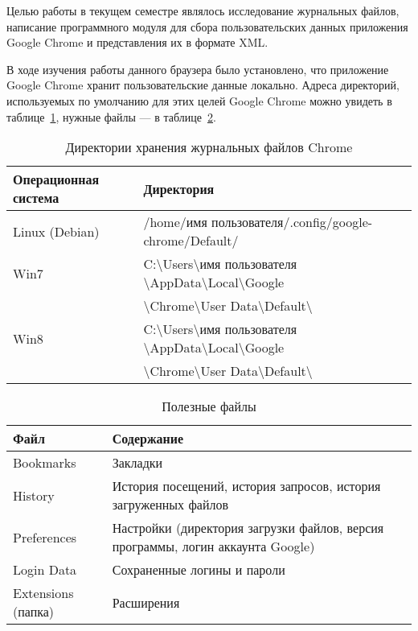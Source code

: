 Целью работы в текущем семестре являлось исследование журнальных файлов, написание программного модуля для сбора пользовательских данных приложения Google Chrome и представления их в формате XML.


В ходе изучения работы данного браузера было установлено, что приложение Google Chrome хранит пользовательские данные локально. Адреса директорий, используемых по умолчанию для этих целей Google Chrome можно увидеть в таблице~\ref{tab:tab_1}, нужные файлы --- в таблице~\ref{tab:tab_2}.


\begin{table}[ht]
\caption{Директории хранения журнальных файлов Chrome}
\label{tab:tab_1}
\begin{center}
\begin{tabularx}{\linewidth}{|l|X|}
\hline
Операционная система & Директория \\
\hline
Linux (Debian) & /home/имя пользователя/.config/google-chrome/Default/ \\
\hline
Win7 & C:\textbackslash Users\textbackslash имя пользователя \textbackslash AppData\textbackslash Local\textbackslash Google \\
 & \textbackslash Chrome\textbackslash User Data\textbackslash Default\textbackslash \\
\hline
Win8 & C:\textbackslash Users\textbackslash имя пользователя \textbackslash AppData\textbackslash Local\textbackslash Google \\
 & \textbackslash Chrome\textbackslash User Data\textbackslash Default\textbackslash \\
\hline
\end{tabularx}
\end{center}
\end{table}

\begin{table}[ht]
\caption{Полезные файлы}
\label{tab:tab_2}
\begin{center}
\begin{tabularx}{\linewidth}{|l|X|}
\hline
Файл & Содержание \\
\hline
Bookmarks & Закладки \\
\hline
History & История посещений, история запросов, история загруженных файлов \\
\hline
Preferences & Настройки (директория загрузки файлов, версия программы, логин аккаунта Google) \\
\hline
Login Data & Сохраненные логины и пароли \\
\hline
Extensions (папка) & Расширения \\
\hline
\end{tabularx}
\end{center}
\end{table}


